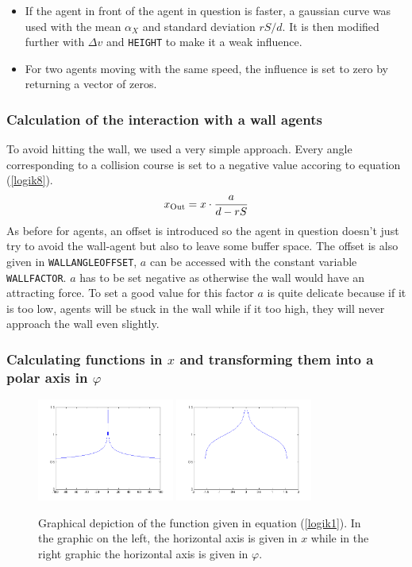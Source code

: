 \begin{itemize}
	\item If the agent in front of the agent in question is faster, a gaussian curve was used with the mean $\alpha_X$ and standard deviation $rS/d$. It is then modified further with $\Delta v$ and \texttt{HEIGHT} to make it a weak influence.
	\item For two agents moving with the same speed, the influence is set to zero by returning a vector of zeros.
\end{itemize}


\subsubsection{Calculation of the interaction with a wall agents}
To avoid hitting the wall, we used a very simple approach. Every angle corresponding to a collision course is set to a negative value accoring to equation (\ref{logik8}).
\begin{equation}\label{logik8}
	x_{\text{Out}} = x \cdot \frac{a}{d - rS}
\end{equation}
\noi As before for agents, an offset is introduced so the agent in question doesn't just try to avoid the wall-agent but also to leave some buffer space. The offset is also given in \texttt{WALLANGLEOFFSET}, $a$ can be accessed with the constant variable \texttt{WALLFACTOR}. $a$ has to be set negative as otherwise the wall would have an attracting force. To set a good value for this factor $a$ is quite delicate because if it is too low, agents will be stuck in the wall while if it too high, they will never approach the wall even slightly. 

\subsubsection{Calculating functions in $x$ and transforming them into a polar axis in $\varphi$}
\begin{figure}[h!]
	\centering
		\includegraphics[width=0.40\textwidth]{pictures/Bsp2}
		\includegraphics[width=0.40\textwidth]{pictures/Bsp2Angle}
	\caption{Graphical depiction of the function given in equation (\ref{logik1}). In the graphic on the left, the horizontal axis is given in $x$ while in the right graphic the horizontal axis is given in $\varphi$.}
	\label{fig:Bsp2}
\end{figure}

